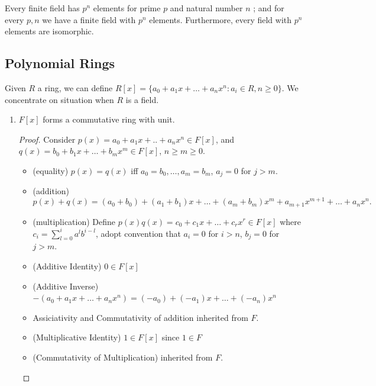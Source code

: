 
\begin{fact}
	Every finite field has $p^n$ elements for prime $p$ and natural number $n$ ; and for every $p,n$ we have a finite field with $p^n$ elements. Furthermore, every field with $p^n$ elements are isomorphic.
\end{fact}

\subsection{Polynomial Rings}

Given $R$ a ring, we can define $R[x] = \{a_0 + a_1x + \ldots + a_n x^n: a_i \in R, n \ge 0\} $. We concentrate on situation when $R$ is a field.
\begin{enumerate}
	\item $F[x]$ forms a commutative ring with unit.
		 \begin{proof}
			 Consider $p(x) = a_0 + a_1x + .. + a_n x^n \in F[x]$, and $q(x) = b_0 + b_1x + \ldots + b_m x^m \in F[x]$, $n \ge m \ge 0$.

			 \begin{itemize}
			 	\item (equality)
			 $p(x) = q(x)$ iff $a_0 = b_0, \ldots, a_m = b_m$, $a_j = 0$ for $j > m$. 
		                \item (addition)
					\[
						p(x)+ q(x) = (a_0+b_0) + (a_1+b_1)x + \ldots + (a_m + b_m)x^m + a_{m+1}x^{m+1} + \ldots + a_n x^n
					.\] 
				\item (multiplication)
					Define $p(x) q(x) = c_0 + c_1x + \ldots + c_r x^r \in F[x]$ where  $c_i = \sum_{l=0}^{i} a^l b^{i - l}$, adopt convention that $a_i = 0$ for $i > n$, $b_j = 0$ for $j > m$.
				\item (Additive Identity) $0 \in F[x]$
				\item (Additive Inverse) $-(a_0+a_1x+\ldots+a_nx^n) = (-a_0) + (-a_1) x + \ldots + (-a_n)x^n$
				\item Assiciativity and Commutativity of addition inherited from $F$.
				\item (Multiplicative Identity) $1 \in F[x]$ since $1 \in F$
				\item (Commutativity of Multiplication) inherited from $F$.

			 \end{itemize}
		\end{proof}
\end{enumerate}


